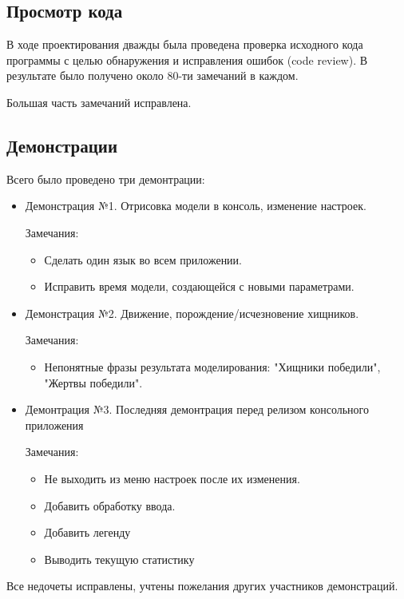 \documentclass[a4paper]{article}
\begin{document}
\subsection{Просмотр кода}
В ходе проектирования дважды была проведена проверка исходного кода программы с целью обнаружения и исправления ошибок (code review). В результате было получено около 80-ти замечаний в каждом.

Большая часть замечаний исправлена. 
\subsection{Демонстрации}
Всего было проведено три демонтрации:
\begin{itemize}

\item Демонстрация №1.
Отрисовка модели в консоль, изменение настроек.

Замечания:

\begin{itemize}
\item Сделать один язык во всем приложении. 
\item Исправить время модели, создающейся с новыми параметрами.
\end{itemize}

\item Демонстрация №2.
Движение, порождение/исчезновение хищников.

Замечания:

\begin{itemize}
\item Непонятные фразы результата моделирования: "Хищники победили", "Жертвы победили".
\end{itemize}

\item Демонтрация №3.
Последняя демонтрация перед релизом консольного приложения

Замечания:

\begin{itemize}
\item Не выходить из меню настроек после их изменения.
\item Добавить обработку ввода.
\item Добавить легенду
\item Выводить текущую статистику
\end{itemize}

\end{itemize} 
Все недочеты исправлены, учтены пожелания других участников демонстраций. 
\end{document}
